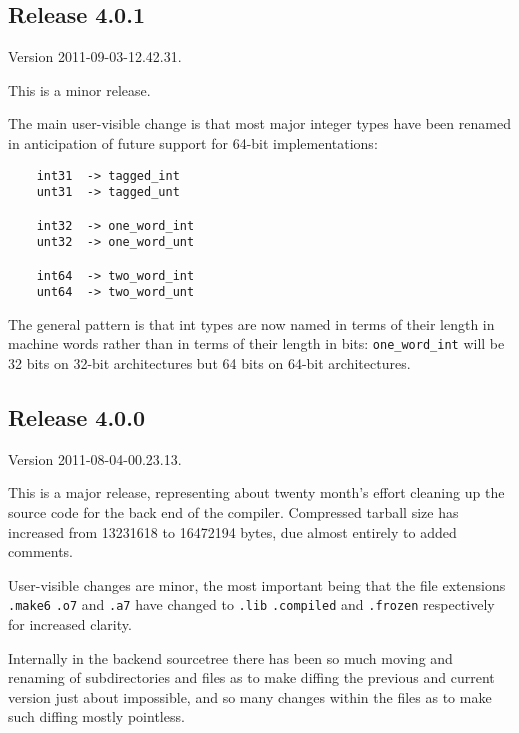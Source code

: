 \cutend*



\subsection{Release 4.0.1}
\label{section:src:release-4.0.1}

Version 2011-09-03-12.42.31.

This is a minor release.

The main user-visible change is that most major integer types have been 
renamed in anticipation of future support for 64-bit implementations:

\begin{verbatim}
    int31  -> tagged_int
    unt31  -> tagged_unt

    int32  -> one_word_int
    unt32  -> one_word_unt

    int64  -> two_word_int
    unt64  -> two_word_unt
\end{verbatim}

The general pattern is that int types are now named in terms of their 
length in machine words rather than in terms of their length in bits: 
{\tt one\_word\_int} will be 32 bits on 32-bit architectures but 64 bits on 64-bit 
architectures.

\cutend*



\subsection{Release 4.0.0}
\label{section:src:release-4.0.0}

Version 2011-08-04-00.23.13.

This is a major release, representing about twenty month's 
effort cleaning up the source code for the back end of the 
compiler.  Compressed tarball size has increased from 
13231618 to 16472194 bytes, due almost entirely to added comments. 

User-visible changes are minor, the most important being that 
the file extensions {\tt .make6} {\tt .o7} and {\tt .a7} have changed to 
{\tt .lib} {\tt .compiled} and {\tt .frozen} respectively for increased clarity. 

Internally in the backend sourcetree there has been so much moving 
and renaming of subdirectories and files as to make diffing the 
previous and current version just about impossible, and so many 
changes within the files as to make such diffing mostly pointless. 


